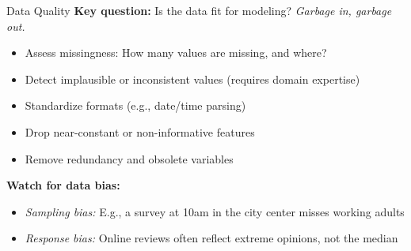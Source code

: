 \documentclass[10pt,compress,t,notes=noshow, xcolor=table]{beamer}
\begin{document}
\begin{frame}{Data Quality}
\label{data-quality}
\textbf{Key question:} Is the data fit for modeling? \emph{Garbage in, garbage out.}

\begin{itemize}
  \item Assess missingness: How many values are missing, and where?
  \item Detect implausible or inconsistent values (requires domain expertise)
  \item Standardize formats (e.g., date/time parsing)
  \item Drop near-constant or non-informative features
  \item Remove redundancy and obsolete variables
\end{itemize}

\vspace{0.5em}
\textbf{Watch for data bias:}
\begin{itemize}
  \item \textit{Sampling bias:} E.g., a survey at 10am in the city center misses working adults
  \item \textit{Response bias:} Online reviews often reflect extreme opinions, not the median
\end{itemize}
\end{frame}







\end{document}

